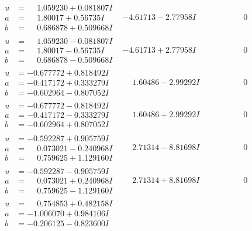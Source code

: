 \documentclass[1p]{elsarticle_modified}
\theoremstyle{definition}
\begin{document}
$$\begin{array}{c|c|c}
\begin{aligned}
u &= \phantom{-}1.059230 + 0.081807 I \\
a &= \phantom{-}1.80017 + 0.56735 I \\
b &= \phantom{-}0.686878 + 0.509668 I\end{aligned}
 & -4.61713 - 2.77958 I & \phantom{-0.000000 } 0 \\ \hline\begin{aligned}
u &= \phantom{-}1.059230 - 0.081807 I \\
a &= \phantom{-}1.80017 - 0.56735 I \\
b &= \phantom{-}0.686878 - 0.509668 I\end{aligned}
 & -4.61713 + 2.77958 I & \phantom{-0.000000 } 0 \\ \hline\begin{aligned}
u &= -0.677772 + 0.818492 I \\
a &= -0.417172 + 0.333279 I \\
b &= -0.602964 - 0.807052 I\end{aligned}
 & \phantom{-}1.60486 - 2.99292 I & \phantom{-0.000000 } 0 \\ \hline\begin{aligned}
u &= -0.677772 - 0.818492 I \\
a &= -0.417172 - 0.333279 I \\
b &= -0.602964 + 0.807052 I\end{aligned}
 & \phantom{-}1.60486 + 2.99292 I & \phantom{-0.000000 } 0 \\ \hline\begin{aligned}
u &= -0.592287 + 0.905759 I \\
a &= \phantom{-}0.073021 - 0.240968 I \\
b &= \phantom{-}0.759625 + 1.129160 I\end{aligned}
 & \phantom{-}2.71314 - 8.81698 I & \phantom{-0.000000 } 0 \\ \hline\begin{aligned}
u &= -0.592287 - 0.905759 I \\
a &= \phantom{-}0.073021 + 0.240968 I \\
b &= \phantom{-}0.759625 - 1.129160 I\end{aligned}
 & \phantom{-}2.71314 + 8.81698 I & \phantom{-0.000000 } 0 \\ \hline\begin{aligned}
u &= \phantom{-}0.754853 + 0.482158 I \\
a &= -1.006070 + 0.984106 I \\
b &= -0.206125 - 0.823600 I\end{aligned}

\end{array}$$
\end{document}
